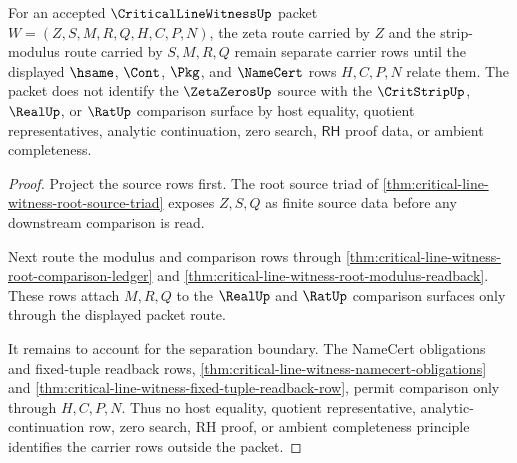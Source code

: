 \begin{theorem}
\label{thm:critical-line-witness-zeta-route-carrier-separation}
For an accepted $\CriticalLineWitnessUp$ packet $W=(Z,S,M,R,Q,H,C,P,N)$, the zeta route carried by $Z$ and the strip-modulus route carried by $S,M,R,Q$ remain separate carrier rows until the displayed $\hsame$, $\Cont$, $\Pkg$, and $\NameCert$ rows $H,C,P,N$ relate them. The packet does not identify the $\ZetaZerosUp$ source with the $\CritStripUp$, $\RealUp$, or $\RatUp$ comparison surface by host equality, quotient representatives, analytic continuation, zero search, $\mathsf{RH}$ proof data, or ambient completeness.
\end{theorem}
\begin{proof}
Project the source rows first. The root source triad of \autoref{thm:critical-line-witness-root-source-triad} exposes $Z,S,Q$ as finite source data before any downstream comparison is read.

Next route the modulus and comparison rows through \autoref{thm:critical-line-witness-root-comparison-ledger} and \autoref{thm:critical-line-witness-root-modulus-readback}. These rows attach $M,R,Q$ to the $\RealUp$ and $\RatUp$ comparison surfaces only through the displayed packet route.

It remains to account for the separation boundary. The NameCert obligations and fixed-tuple readback rows, \autoref{thm:critical-line-witness-namecert-obligations} and \autoref{thm:critical-line-witness-fixed-tuple-readback-row}, permit comparison only through $H,C,P,N$. Thus no host equality, quotient representative, analytic-continuation row, zero search, RH proof, or ambient completeness principle identifies the carrier rows outside the packet.
\end{proof}

